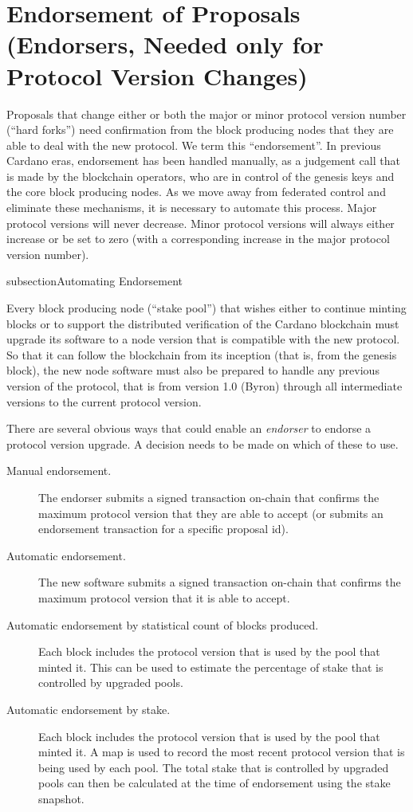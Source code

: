 \newpage
\section{Endorsement of Proposals (Endorsers, Needed only for Protocol Version Changes)}
\label{sect:endorsement}

Proposals that change either or both the major or minor protocol version number (``hard forks'') need confirmation from the block producing nodes that they are able
to deal with the new protocol.  We term this ``endorsement''.   In previous Cardano eras, endorsement has been handled manually, as a judgement call that
is made by the blockchain operators, who are in control of the genesis keys and the core block producing nodes.  As we move away from federated control and eliminate these
mechanisms, it is necessary to automate this process.  Major protocol versions will never decrease.  Minor protocol versions will always either increase or be set to zero
(with a corresponding increase in the major protocol version number).

subsection{Automating Endorsement}

Every block producing node (``stake pool'') that wishes either to continue minting
blocks or to support the distributed verification of the Cardano blockchain must upgrade its
software to a node version that is compatible with the new protocol.  So that it
can follow the blockchain from its inception (that is, from the genesis block),
the new node software must also be prepared to handle any previous version of
the protocol, that is from version 1.0 (Byron) through all intermediate versions to the current protocol version.

There are several obvious ways that could enable an \emph{endorser} to endorse a protocol version upgrade.  A decision needs
to be made on which of these to use.

\begin{description}
\item
  [Manual endorsement.]  The endorser submits a signed transaction on-chain that confirms the maximum protocol version that they are
  able to accept (or submits an endorsement transaction for a specific proposal id).
\item
  [Automatic endorsement.]  The new software submits a signed transaction on-chain that confirms the maximum protocol version that it is
  able to accept.
\item
  [Automatic endorsement by statistical count of blocks produced.]  Each block includes the protocol version that is used by the pool that minted it.  This can be used to
  estimate the percentage of stake that is controlled by upgraded pools.
\item
  [Automatic endorsement by stake.]  Each block includes the protocol version that is used by the pool that minted it.  A map is used
  to record the most recent protocol version that is being used by each pool.  The total stake that is controlled by upgraded pools can then
  be calculated at the time of endorsement using the stake snapshot.
\end{description}

